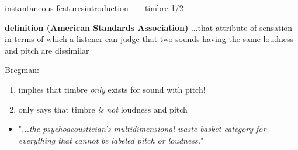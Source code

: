         \begin{frame}{instantaneous features}{introduction~---~timbre 1/2}
            \begin{block}{\textbf{definition (American Standards Association)}}
                ...that attribute of sensation in terms of which a listener can judge that two sounds having the same loudness and pitch are dissimilar
            \end{block}
            \pause
            \vspace{-5mm}
            Bregman:
                    \begin{enumerate}
                        \item   implies that timbre \textit{only} exists for sound with pitch!
                        \item   only says that timbre \textit{is not} loudness and pitch
                    \end{enumerate}
            \pause
            
            \begin{itemize}
                \item[$\rightarrow$]   [timbre is] "\textit{...the psychoacoustician's multidimensional waste-basket category for everything that cannot be labeled pitch or loudness.}"
            \end{itemize}
        \end{frame}
        
